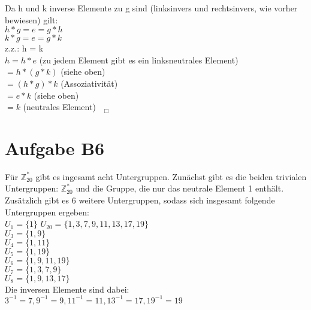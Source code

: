 \documentclass[11pt,a4paper]{article}
\begin{document}
Da h und k inverse Elemente zu g sind (linksinvers und rechtsinvers, wie vorher bewiesen) gilt: \\
$ h \ast  g = e = g \ast  h$ \\
$ k \ast  g = e = g \ast  k$  \\

z.z.: h = k \\
$h = h \ast e$   (zu jedem Element gibt es ein linksneutrales Element) \\
$= h \ast (g \ast k)$    (siehe oben) \\
$= (h \ast g) \ast k$    (Assoziativität) \\
$= e \ast k$      (siehe oben) \\
$=k$       (neutrales Element) $~~~_\Box$ \\

\section*{Aufgabe B6}
Für $\mathbb{Z}^{*}_{20}$ gibt es ingesamt acht Untergruppen. Zunächst gibt es die beiden trivialen Untergruppen:  $\mathbb{Z}^{*}_{20}$ und die Gruppe, die nur das neutrale Element 1 enthält. Zusätzlich gibt es 6 weitere Untergruppen, sodass sich insgesamt folgende Untergruppen ergeben: \\
$U_1 =\{1\}$
$U_20 = \{1,3,7,9,11,13,17,19\}$\\
$U_3=\{1,9\}$\\
$U_4=\{1,11\}$\\
$U_5=\{1,19\}$\\
$U_6=\{1,9,11,19\}$\\
$U_7=\{1,3,7,9\}$\\
$U_8=\{1,9,13,17\}$\\

Die inversen Elemente sind dabei: \\
$3^{-1}=7, 9^{-1}=9, 11^{-1}=11, 13^{-1}=17, 19^{-1}=19$\\
\end{document}
